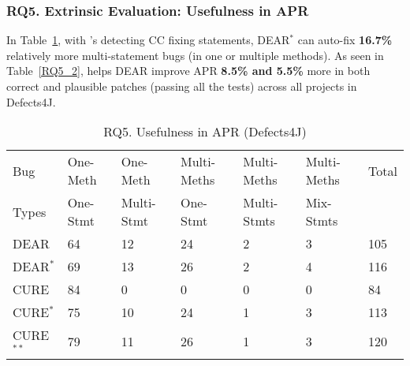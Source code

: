 \subsubsection{\bf RQ5. Extrinsic Evaluation: Usefulness in APR}
In Table~\ref{RQ5_1}, with {\tool}'s detecting CC fixing
statements, DEAR$^{*}$ can auto-fix {\bf 16.7\%} relatively more
multi-statement bugs (in one or multiple methods). As seen in
Table~\ref{RQ5_2}, {\tool} helps DEAR improve APR {\bf 8.5\% and 5.5\%} more in
both correct and plausible patches (passing all the tests) across all
projects in Defects4J.

\begin{table}[t]
	\caption{RQ5. Usefulness in APR (Defects4J)}
	\vspace{-12pt}
	\begin{center}
        \tabcolsep 2pt
		\footnotesize
		\renewcommand{\arraystretch}{1} 
		\begin{tabular}{p{0.7cm}<{\centering}|p{1.1cm}<{\centering}|p{1.1cm}<{\centering}|p{1.3cm}<{\centering}|p{1.3cm}<{\centering}|p{1.3cm}<{\centering}|p{0.7cm}<{\centering}}
			\hline
			Bug            & One-Meth & One-Meth   & Multi-Meths & Multi-Meths & Multi-Meths & Total\\
			Types          & One-Stmt & Multi-Stmt & One-Stmt    & Multi-Stmts & Mix-Stmts   & \\\hline
			DEAR           & 64       & 12         & 24          & 2           & 3           & 105\\
			DEAR$^{*}$     & 69       & 13         & 26          & 2           & 4           & 116\\
			CURE           & 84       & 0          & 0           & 0           & 0           & 84\\
			CURE$^{*}$     & 75       & 10         & 24          & 1           & 3           & 113\\
			CURE$^{**}$    & 79       & 11         & 26          & 1           & 3           & 120\\   
			\hline
		\end{tabular}
		\label{RQ5_1}
		{\color{red}{CURE: the Ochiai + CURE; CURE*: the DEAR FL + CURE; CURE**: the FixLocator + CURE}}
	\end{center}
\vspace{-5pt}
\end{table}


